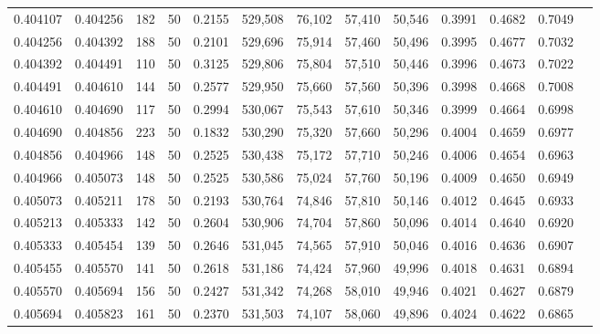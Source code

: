 \begin{tabular}{rrrrrrrrrrrrr}
0.404107 & 0.404256 &   182 &  50 &                                     0.2155 & 529,508 &  76,102 &  57,410 &  50,546 & 0.3991 & 0.4682 & 0.7049 \\
0.404256 & 0.404392 &   188 &  50 &                                     0.2101 & 529,696 &  75,914 &  57,460 &  50,496 & 0.3995 & 0.4677 & 0.7032 \\
0.404392 & 0.404491 &   110 &  50 &                                     0.3125 & 529,806 &  75,804 &  57,510 &  50,446 & 0.3996 & 0.4673 & 0.7022 \\
0.404491 & 0.404610 &   144 &  50 &                                     0.2577 & 529,950 &  75,660 &  57,560 &  50,396 & 0.3998 & 0.4668 & 0.7008 \\
0.404610 & 0.404690 &   117 &  50 &                                     0.2994 & 530,067 &  75,543 &  57,610 &  50,346 & 0.3999 & 0.4664 & 0.6998 \\
0.404690 & 0.404856 &   223 &  50 &                                     0.1832 & 530,290 &  75,320 &  57,660 &  50,296 & 0.4004 & 0.4659 & 0.6977 \\
0.404856 & 0.404966 &   148 &  50 &                                     0.2525 & 530,438 &  75,172 &  57,710 &  50,246 & 0.4006 & 0.4654 & 0.6963 \\
0.404966 & 0.405073 &   148 &  50 &                                     0.2525 & 530,586 &  75,024 &  57,760 &  50,196 & 0.4009 & 0.4650 & 0.6949 \\
0.405073 & 0.405211 &   178 &  50 &                                     0.2193 & 530,764 &  74,846 &  57,810 &  50,146 & 0.4012 & 0.4645 & 0.6933 \\
0.405213 & 0.405333 &   142 &  50 &                                     0.2604 & 530,906 &  74,704 &  57,860 &  50,096 & 0.4014 & 0.4640 & 0.6920 \\
0.405333 & 0.405454 &   139 &  50 &                                     0.2646 & 531,045 &  74,565 &  57,910 &  50,046 & 0.4016 & 0.4636 & 0.6907 \\
0.405455 & 0.405570 &   141 &  50 &                                     0.2618 & 531,186 &  74,424 &  57,960 &  49,996 & 0.4018 & 0.4631 & 0.6894 \\
0.405570 & 0.405694 &   156 &  50 &                                     0.2427 & 531,342 &  74,268 &  58,010 &  49,946 & 0.4021 & 0.4627 & 0.6879 \\
0.405694 & 0.405823 &   161 &  50 &                                     0.2370 & 531,503 &  74,107 &  58,060 &  49,896 & 0.4024 & 0.4622 & 0.6865 \\

\end{tabular}
